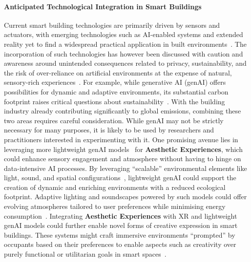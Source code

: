 \paragraph{Anticipated Technological Integration in Smart Buildings} Current smart building technologies are primarily driven by sensors and actuators, with emerging technologies such as AI-enabled systems and extended reality yet to find a widespread practical application in built environments~\cite{moreno2024generative}. The incorporation of such technologies has however been discussed with caution and awareness around unintended consequences related to privacy, sustainability, and the risk of over-reliance on artificial environments at the expense of natural, sensory-rich experiences~\cite{moreno2024generative}. For example, while generative AI (genAI) offers possibilities for dynamic and adaptive environments, its substantial carbon footprint raises critical questions about sustainability~\cite{chien2023reducing}. With the building industry already contributing significantly to global emissions, combining these two areas requires careful consideration. While genAI may not be strictly necessary for many purposes, it is likely to be used by researchers and practitioners interested in experimenting with it. One promising avenue lies in leveraging more lightweight genAI models~\cite{mei2023lightlm} for \textbf{Aesthetic Experiences}, which could enhance sensory engagement and atmosphere without having to hinge on data-intensive AI processes. By leveraging ``scalable'' environmental elements like light, sound, and spatial configurations~\cite{deng2019diffusive, ishiguro2014ubisonus}, lightweight genAI could support the creation of dynamic and enriching environments with a reduced ecological footprint. Adaptive lighting and soundscapes powered by such models could offer evolving atmospheres tailored to user preferences while minimising energy consumption~\cite{zhao2017mediated}. Integrating \textbf{Aesthetic Experiences} with XR and lightweight genAI models could further enable novel forms of creative expression in smart buildings. These systems might craft immersive environments ``prompted'' by occupants based on their preferences to enable aspects such as creativity over purely functional or utilitarian goals in smart spaces~\cite{ccetin2024learning}. 


